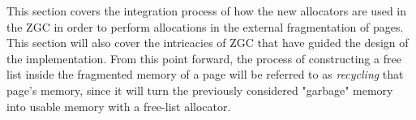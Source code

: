 This section covers the integration process of how the new allocators are used in the ZGC in order to perform allocations in the external fragmentation of pages. This section will also cover the intricacies of ZGC that have guided the design of the implementation. From this point forward, the process of constructing a free list inside the fragmented memory of a page will be referred to as \textit{recycling} that page's memory, since it will turn the previously considered "garbage" memory into usable memory with a free-list allocator.


